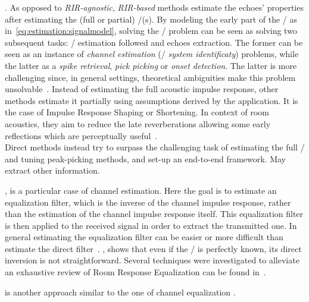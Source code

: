 .
As opposed to \textit{RIR-agnostic}, \textit{RIR-based} methods estimate the echoes' properties after estimating the (full or partial) \RIR/(s).
By modeling the early part of the \RIR/ as in~\cref{eq:estimation:signalmodel}, solving the \AER/ problem can be seen as solving two subsequent tasks:
\RIR/ estimation followed and echoes extraction.
The former can be seen as an instance of \textit{channel estimation} (\aka/ \textit{system identificaty})  problems, while the latter as a \textit{spike retrieval}, \textit{pick picking} or \textit{onset detection}.
The latter is more challenging since, in general settings, theoretical ambiguities make this problem unsolvable~.
Instead of estimating the full acoustic impulse response, other methods estimate it partially using assumptions derived by the application.
It is the case of Impulse Response Shaping or Shortening.
In context of room acoustics, they aim to reduce the late reverberations allowing some early reflections which are perceptually useful~.
\\Direct methods instead try to surpass the challenging task of estimating the full \RIR/ and tuning peak-picking methods, and set-up an end-to-end framework.
May extract other information.

, is a particular case of channel estimation.
Here the goal is to estimate an equalization filter, which is the inverse of the channel impulse response, rather than the estimation of the channel impulse response itself.
This equalization filter is then applied to the received signal in order to extract the transmitted one.
In general estimating the equalization filter can be easier or more difficult than estimate the direct filter~.
, shows that even if the \RIR/ is perfectly known, its direct inversion is not straightforward.
Several techniques were investigated to alleviate an exhaustive review of Room Response Equalization can be found in~.

 is another approach similar to the one of channel equalization .

